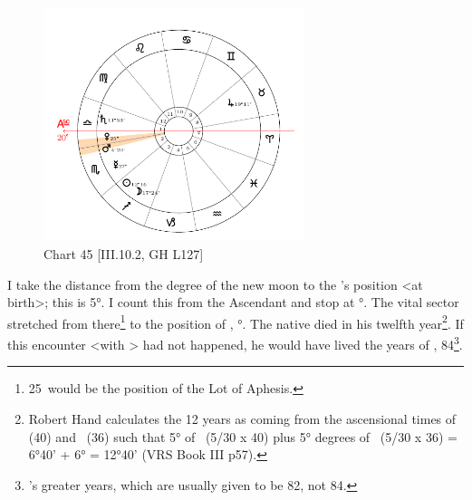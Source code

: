 \clearpage
\begin{figure}
\centering
\vspace{-20pt}
\includegraphics[width=0.68\textwidth]{charts/3_10_2}
\caption{Chart 45 [III.10.2, GH L127]}
\label{fig:chart45}
\end{figure} 


I take the distance from the degree of the new moon to the \Moon’s position <at birth>; this is 5°. I count this from the Ascendant and stop at \Libra\xspace 25°. The vital sector stretched from there\footnote{25\Libra\, would be the position of the Lot of Aphesis.} to the position of \Mars, \Scorpio\xspace 5°. The native died in his twelfth year\footnote{Robert Hand calculates the 12 years as coming from the ascensional times of \Libra\, (40) and \Scorpio\, (36) such that 5° of \Libra\, (5/30 x 40) plus 5° degrees of \Scorpio\, (5/30 x 36) = 6°40' + 6° = 12°40' (VRS Book III p57).}. If this encounter <with \Mars> had not happened, he would have lived the years of \Venus, 84\footnote{\Venus's greater years, which are usually given to be 82, not 84.}.

\newpage